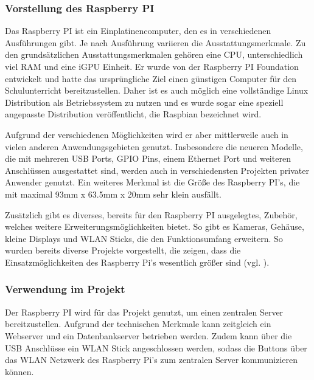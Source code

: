 \subsubsection{Vorstellung des Raspberry PI}        
\label{sec:Vorstellung des Raspberry PI-1} 

Das Raspberry PI ist ein Einplatinencomputer, den es in verschiedenen Ausführungen gibt. Je nach Ausführung variieren die Ausstattungsmerkmale. Zu den grundsätzlichen Ausstattungsmerkmalen gehören eine \ac{CPU}, unterschiedlich viel \ac{RAM} und eine \ac{iGPU} Einheit. Er wurde von der Raspberry PI Foundation entwickelt und hatte das ursprüngliche Ziel einen günstigen Computer für den Schulunterricht bereitzustellen. Daher ist es auch möglich eine vollständige Linux Distribution als Betriebssystem zu nutzen und es wurde sogar eine speziell angepasste Distribution veröffentlicht, die Raspbian bezeichnet wird. 

Aufgrund der verschiedenen Möglichkeiten wird er aber mittlerweile auch in vielen anderen Anwendungsgebieten genutzt. Insbesondere die neueren Modelle, die mit mehreren \ac{USB} Ports, \ac{GPIO} Pins, einem Ethernet Port und weiteren Anschlüssen ausgestattet sind, werden auch in verschiedensten Projekten privater Anwender genutzt. Ein weiteres Merkmal ist die Größe des Raspberry PI's, die mit maximal 93mm x 63.5mm x 20mm sehr klein ausfällt. 

Zusätzlich gibt es diverses, bereits für den Raspberry PI ausgelegtes, Zubehör, welches weitere Erweiterungsmöglichkeiten bietet. So gibt es Kameras, Gehäuse, kleine Displays und \ac{WLAN} Sticks, die den Funktionsumfang erweitern. So wurden bereits diverse Projekte vorgestellt, die zeigen, dass die Einsatzmöglichkeiten des Raspberry Pi's wesentlich größer sind (vgl. \cite{.28.12.2016} \cite{.28.01.2017}).



\subsubsection{Verwendung im Projekt}        
\label{sec:Verwendung des Raspberry PI-1} 
Der Raspberry PI wird für das Projekt genutzt, um einen zentralen Server bereitzustellen. Aufgrund der technischen Merkmale kann zeitgleich ein Webserver und ein Datenbankserver betrieben werden. Zudem kann über die \ac{USB} Anschlüsse ein \ac{WLAN} Stick angeschlossen werden, sodass die Buttons über das \ac{WLAN} Netzwerk des Raspberry Pi's zum zentralen Server kommunizieren können. 

